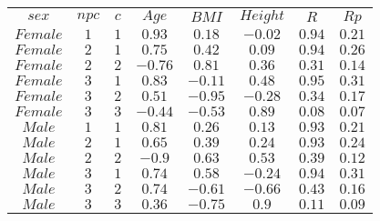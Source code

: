 \begin{tabular}{cccccccc}
$sex$ & $npc$ & $c$ & $Age$ & $BMI$ & $Height$ & $R$ & $Rp$\\
$Female$ & $1$ & $1$ & $0.93$ & $0.18$ & $-0.02$ & $0.94$ & $0.21$\\
$Female$ & $2$ & $1$ & $0.75$ & $0.42$ & $0.09$ & $0.94$ & $0.26$\\
$Female$ & $2$ & $2$ & $-0.76$ & $0.81$ & $0.36$ & $0.31$ & $0.14$\\
$Female$ & $3$ & $1$ & $0.83$ & $-0.11$ & $0.48$ & $0.95$ & $0.31$\\
$Female$ & $3$ & $2$ & $0.51$ & $-0.95$ & $-0.28$ & $0.34$ & $0.17$\\
$Female$ & $3$ & $3$ & $-0.44$ & $-0.53$ & $0.89$ & $0.08$ & $0.07$\\
$Male$ & $1$ & $1$ & $0.81$ & $0.26$ & $0.13$ & $0.93$ & $0.21$\\
$Male$ & $2$ & $1$ & $0.65$ & $0.39$ & $0.24$ & $0.93$ & $0.24$\\
$Male$ & $2$ & $2$ & $-0.9$ & $0.63$ & $0.53$ & $0.39$ & $0.12$\\
$Male$ & $3$ & $1$ & $0.74$ & $0.58$ & $-0.24$ & $0.94$ & $0.31$\\
$Male$ & $3$ & $2$ & $0.74$ & $-0.61$ & $-0.66$ & $0.43$ & $0.16$\\
$Male$ & $3$ & $3$ & $0.36$ & $-0.75$ & $0.9$ & $0.11$ & $0.09$\\
\end{tabular}
